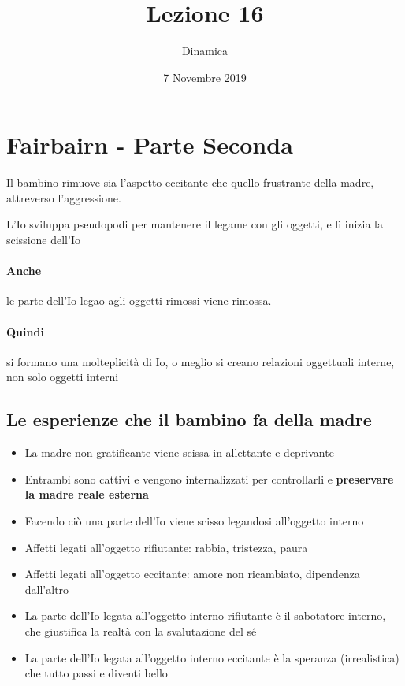\documentclass[12pt, a4paper]{article}
\date{7 Novembre 2019}
\title{Lezione 16}
\author{Dinamica}
\begin{document}
\maketitle

\section{Fairbairn - Parte Seconda}

Il bambino rimuove sia l'aspetto eccitante che quello frustrante della madre, attreverso l'aggressione.

L'Io sviluppa pseudopodi per mantenere il legame con gli oggetti, e l\`i inizia la scissione dell'Io

\paragraph{Anche} le parte dell'Io legao agli oggetti rimossi viene rimossa.

\paragraph{Quindi} si formano una molteplicit\`a di Io, o meglio si creano relazioni oggettuali interne, non solo oggetti interni 

\subsection{Le esperienze che il bambino fa della madre}

\begin{itemize}
    \item La madre non gratificante viene scissa in allettante e deprivante
    \item Entrambi sono cattivi e vengono internalizzati per controllarli e \textbf{preservare la madre reale esterna}
    \item Facendo ciò una parte dell'Io viene scisso legandosi all'oggetto interno
    \item Affetti legati all'oggetto rifiutante: rabbia, tristezza, paura
    \item Affetti legati all'oggetto eccitante: amore non ricambiato, dipendenza dall'altro
    \item La parte dell'Io legata all'oggetto interno rifiutante \`e il sabotatore interno, che giustifica la realt\`a con la svalutazione del s\'e
    \item La parte dell'Io legata all'oggetto interno eccitante \`e la speranza (irrealistica) che tutto passi e diventi bello
\end{itemize}
\end{document}
